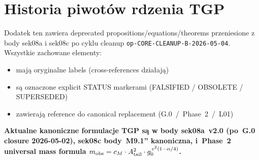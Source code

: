 %
%
%

\section{Historia piwot\'ow rdzenia TGP}\label{app:pivot-history}


\begin{remark}\label{rem:pivot-history-purpose}
Dodatek ten zawiera deprecated propositions/equations/theorems
przeniesione z body sek08a i sek08c po cyklu cleanup
\texttt{op-CORE-CLEANUP-B-2026-05-04}. Wszystkie zachowane elementy:
\begin{itemize}\itemsep0pt
  \item maj\k{a} oryginalne labels (cross-references dzia\l{}aj\k{a})
  \item s\k{a} oznaczone explicit STATUS markerami
    (FALSIFIED / OBSOLETE / SUPERSEDED)
  \item zawieraj\k{a} reference do canonical replacement
    (G.0~/~Phase~2~/~L01)
\end{itemize}

\textbf{Aktualne kanoniczne formulacje TGP s\k{a} w body sek08a~v2.0
(po~G.0 closure 2026-05-02), sek08c body~M9.1'' kanoniczna,
i~Phase~2 universal mass formula
$m_{\rm obs} = c_M \cdot A_{\rm tail}^2 \cdot g_0^{\,e^2(1-\alpha/4)}$.}
\end{remark}

